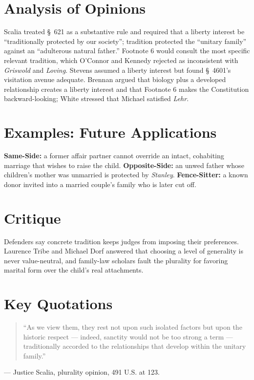 \documentclass[12pt]{article}
\begin{document}
\section{Analysis of Opinions}
Scalia treated \S~621 as a substantive rule and required that a liberty interest be ``traditionally protected by our society''; tradition protected the ``unitary family'' against an ``adulterous natural father.'' Footnote 6 would consult the most specific relevant tradition, which O'Connor and Kennedy rejected as inconsistent with \textit{Griswold} and \textit{Loving}. Stevens assumed a liberty interest but found \S~4601's visitation avenue adequate. Brennan argued that biology plus a developed relationship creates a liberty interest and that Footnote 6 makes the Constitution backward-looking; White stressed that Michael satisfied \textit{Lehr}.

\section{Examples: Future Applications}
\textbf{Same-Side:} a former affair partner cannot override an intact, cohabiting marriage that wishes to raise the child. \textbf{Opposite-Side:} an unwed father whose children's mother was unmarried is protected by \textit{Stanley}. \textbf{Fence-Sitter:} a known donor invited into a married couple's family who is later cut off.

\section{Critique}
Defenders say concrete tradition keeps judges from imposing their preferences. Laurence Tribe and Michael Dorf answered that choosing a level of generality is never value-neutral, and family-law scholars fault the plurality for favoring marital form over the child's real attachments.

\section{Key Quotations}
\begin{quote}
``As we view them, they rest not upon such isolated factors but upon the historic respect --- indeed, sanctity would not be too strong a term --- traditionally accorded to the relationships that develop within the unitary family.''
\end{quote}
\noindent --- Justice Scalia, plurality opinion, 491 U.S. at 123.
\end{document}
